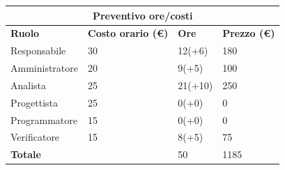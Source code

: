 \documentclass[a4paper, 12pt]{article}
\begin{document}
\begin{center}
	\begin{tabularx}{\textwidth}{|X|X|X|X|}
		\hline
		\multicolumn{4}{|c|}{\textbf{Preventivo ore/costi}}                                      \\
		\hline
		\hline
		\textbf{Ruolo}  & \textbf{Costo orario (\euro)} & \textbf{Ore} & \textbf{Prezzo (\euro)} \\
		\hline
		Responsabile    & 30                            & 12(+6)       & 180                     \\
		\hline
		Amministratore  & 20                            & 9(+5)        & 100                     \\
		\hline
		Analista        & 25                            & 21(+10)      & 250                     \\
		\hline
		Progettista     & 25                            & 0(+0)        & 0                       \\
		\hline
		Programmatore   & 15                            & 0(+0)        & 0                       \\
		\hline
		Verificatore    & 15                            & 8(+5)        & 75                      \\
		\hline
		\hline
		\textbf{Totale} &                               & 50           & 1185                    \\
		\hline
	\end{tabularx}\\[8pt]
	\mbox{}\\
\end{center}
\end{document}

